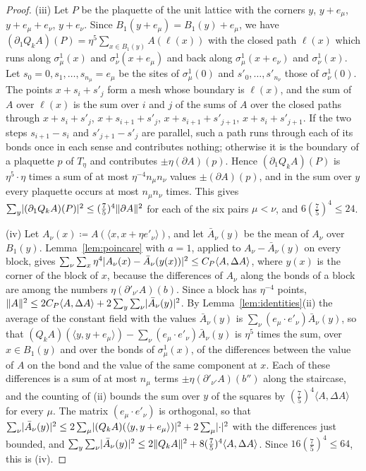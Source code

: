 \documentclass[11pt]{preprint}
\DeclarePairedDelimiter{\abs}{\lvert}{\rvert}
\DeclarePairedDelimiter{\norm}{\lVert}{\rVert}
\numberwithin{equation}{section}
\theoremstyle{definition}
\theoremstyle{remark}
\theoremstyle{plain}
\begin{document}
\begin{proof}
(iii) Let $P$ be the plaquette of the unit lattice with the corners $y$, $y + e_\mu$, $y + e_\mu + e_\nu$, $y + e_\nu$. Since $B_1(y + e_\mu) = B_1(y) + e_\mu$, we have $(\partial_1Q_kA)(P) = \eta^5\sum_{x \in B_1(y)}A(\ell(x))$ with the closed path $\ell(x)$ which runs along $\sigma^1_\mu(x)$ and $\sigma^1_\nu(x + e_\mu)$ and back along $\sigma^1_\mu(x + e_\nu)$ and $\sigma^1_\nu(x)$. Let $s_0 = 0, s_1, \dots, s_{n_\mu} = e_\mu$ be the sites of $\sigma^1_\mu(0)$ and $s'_0, \dots, s'_{n_\nu}$ those of $\sigma^1_\nu(0)$. The points $x + s_i + s'_j$ form a mesh whose boundary is $\ell(x)$, and the sum of $A$ over $\ell(x)$ is the sum over $i$ and $j$ of the sums of $A$ over the closed paths through $x + s_i + s'_j$, $x + s_{i+1} + s'_j$, $x + s_{i+1} + s'_{j+1}$, $x + s_i + s'_{j+1}$. If the two steps $s_{i+1} - s_i$ and $s'_{j+1} - s'_j$ are parallel, such a path runs through each of its bonds once in each sense and contributes nothing; otherwise it is the boundary of a plaquette $p$ of $T_\eta$ and contributes $\pm\eta(\partial A)(p)$. Hence $(\partial_1Q_kA)(P)$ is $\eta^5 \cdot \eta$ times a sum of at most $\eta^{-4}n_\mu n_\nu$ values $\pm(\partial A)(p)$, and in the sum over $y$ every plaquette occurs at most $n_\mu n_\nu$ times. This gives $\sum_y\abs{(\partial_1Q_kA)(P)}^2 \leq (\frac75)^4\norm{\partial A}^2$ for each of the six pairs $\mu < \nu$, and $6(\frac75)^4 \leq 24$.

(iv) Let $A_\nu(x) \coloneqq A(\langle x, x + \eta e'_\nu\rangle)$, and let $\bar A_\nu(y)$ be the mean of $A_\nu$ over $B_1(y)$. Lemma~\ref{lem:poincare} with $a = 1$, applied to $A_\nu - \bar A_\nu(y)$ on every block, gives $\sum_\nu\sum_x\eta^4\abs{A_\nu(x) - \bar A_\nu(y(x))}^2 \leq C_P\langle A, \Delta A\rangle$, where $y(x)$ is the corner of the block of $x$, because the differences of $A_\nu$ along the bonds of a block are among the numbers $\eta(\partial'_{\nu'}A)(b)$. Since a block has $\eta^{-4}$ points, $\norm{A}^2 \leq 2C_P\langle A, \Delta A\rangle + 2\sum_y\sum_\nu\abs{\bar A_\nu(y)}^2$. By Lemma~\ref{lem:identities}(ii) the average of the constant field with the values $\bar A_\nu(y)$ is $\sum_\nu(e_\mu \cdot e'_\nu)\bar A_\nu(y)$, so that $(Q_kA)(\langle y, y + e_\mu\rangle) - \sum_\nu(e_\mu \cdot e'_\nu)\bar A_\nu(y)$ is $\eta^5$ times the sum, over $x \in B_1(y)$ and over the bonds of $\sigma^1_\mu(x)$, of the differences between the value of $A$ on the bond and the value of the same component at $x$. Each of these differences is a sum of at most $n_\mu$ terms $\pm\eta(\partial'_{\nu'}A)(b'')$ along the staircase, and the counting of (ii) bounds the sum over $y$ of the squares by $(\frac75)^4\langle A, \Delta A\rangle$ for every $\mu$. The matrix $(e_\mu \cdot e'_\nu)$ is orthogonal, so that $\sum_\nu\abs{\bar A_\nu(y)}^2 \leq 2\sum_\mu\abs{(Q_kA)(\langle y, y + e_\mu\rangle)}^2 + 2\sum_\mu\abs{\cdot}^2$ with the differences just bounded, and $\sum_y\sum_\nu\abs{\bar A_\nu(y)}^2 \leq 2\norm{Q_kA}^2 + 8(\frac75)^4\langle A, \Delta A\rangle$. Since $16(\frac75)^4 \leq 64$, this is (iv).
\end{proof}
\end{document}
